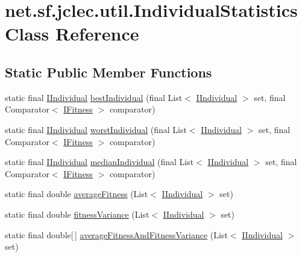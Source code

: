 \hypertarget{classnet_1_1sf_1_1jclec_1_1util_1_1_individual_statistics}{\section{net.\-sf.\-jclec.\-util.\-Individual\-Statistics Class Reference}
\label{classnet_1_1sf_1_1jclec_1_1util_1_1_individual_statistics}
}
\subsection*{Static Public Member Functions}
\begin{DoxyCompactItemize}
\item 
static final \hyperlink{interfacenet_1_1sf_1_1jclec_1_1_i_individual}{I\-Individual} \hyperlink{classnet_1_1sf_1_1jclec_1_1util_1_1_individual_statistics_ac28252ec14113d384cfdc43699fca10d}{best\-Individual} (final List$<$ \hyperlink{interfacenet_1_1sf_1_1jclec_1_1_i_individual}{I\-Individual} $>$ set, final Comparator$<$ \hyperlink{interfacenet_1_1sf_1_1jclec_1_1_i_fitness}{I\-Fitness} $>$ comparator)
\item 
static final \hyperlink{interfacenet_1_1sf_1_1jclec_1_1_i_individual}{I\-Individual} \hyperlink{classnet_1_1sf_1_1jclec_1_1util_1_1_individual_statistics_a03c63516ba2cf9d7ed04b90dec24ecda}{worst\-Individual} (final List$<$ \hyperlink{interfacenet_1_1sf_1_1jclec_1_1_i_individual}{I\-Individual} $>$ set, final Comparator$<$ \hyperlink{interfacenet_1_1sf_1_1jclec_1_1_i_fitness}{I\-Fitness} $>$ comparator)
\item 
static final \hyperlink{interfacenet_1_1sf_1_1jclec_1_1_i_individual}{I\-Individual} \hyperlink{classnet_1_1sf_1_1jclec_1_1util_1_1_individual_statistics_a65a8e74d8c9260dd27c851435811f6c0}{median\-Individual} (final List$<$ \hyperlink{interfacenet_1_1sf_1_1jclec_1_1_i_individual}{I\-Individual} $>$ set, final Comparator$<$ \hyperlink{interfacenet_1_1sf_1_1jclec_1_1_i_fitness}{I\-Fitness} $>$ comparator)
\item 
static final double \hyperlink{classnet_1_1sf_1_1jclec_1_1util_1_1_individual_statistics_a85b69858d76c50925bf729e98c694361}{average\-Fitness} (List$<$ \hyperlink{interfacenet_1_1sf_1_1jclec_1_1_i_individual}{I\-Individual} $>$ set)
\item 
static final double \hyperlink{classnet_1_1sf_1_1jclec_1_1util_1_1_individual_statistics_a097a9f0b3692ad492b2712382b820c69}{fitness\-Variance} (List$<$ \hyperlink{interfacenet_1_1sf_1_1jclec_1_1_i_individual}{I\-Individual} $>$ set)
\item 
static final double\mbox{[}$\,$\mbox{]} \hyperlink{classnet_1_1sf_1_1jclec_1_1util_1_1_individual_statistics_aceb5ed10eb14a4606708fd4a82aab7ee}{average\-Fitness\-And\-Fitness\-Variance} (List$<$ \hyperlink{interfacenet_1_1sf_1_1jclec_1_1_i_individual}{I\-Individual} $>$ set)
\end{DoxyCompactItemize}


